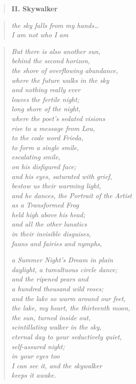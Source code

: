 \clearpage

\begin{verse}
{\bfseries II. Skywalker}
\end{verse}

\begin{quote}
\itshape\smaller
the sky falls from my hands\ldots\\
I am not who I am

\end{quote}

\begin{verse}
\itshape
But there is also another sun,\\
behind the second horizon,\\
the shore of overflowing abundance,\\
where the future walks in the sky\\
and nothing really ever\\
leaves the fertile night;\\
long shore of the night,\\
where the poet's sedated visions\\
rise to a message from Lou,\\
to the code word {\upshape Frieda,}\\
to form a single smile,\\
escalating smile,\\
on his disfigured face;\\
and his eyes, saturated with grief,\\
bestow us their warming light,\\
and he dances, the {\upshape Portrait of the Artist\\
as a Transformed Frog}\\
held high above his head;\\
and all the other lunatics\\
in their invisible disguises,\\
fauns and fairies and nymphs,

{\itshape
a {\upshape Summer Night's Dream} in plain\label{summer-nights}\\
daylight, a tumultuous circle dance;\\
and the ripened pears and\\
a hundred thousand wild roses;\\
and the lake so warm around our feet,\\
the lake, my heart, the thirteenth moon,\\
the sun, turned inside out,\\
scintillating walker in the sky,\\
eternal day to your seductively quiet,\\
self-assured night;\\
in your eyes too\\
I can see it, and the skywalker\\
keeps it awake.}


\end{verse}
